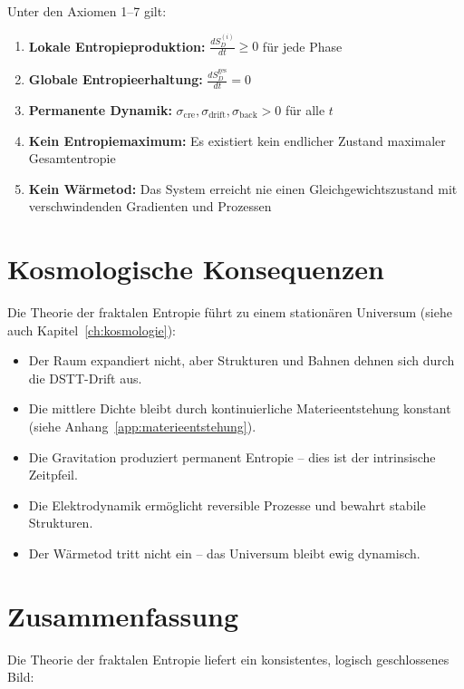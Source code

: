 Unter den Axiomen 1–7 gilt:

\begin{enumerate}
    \item \textbf{Lokale Entropieproduktion:} \( \frac{dS_D^{(i)}}{dt} \geq 0 \) für jede Phase
    \item \textbf{Globale Entropieerhaltung:} \( \frac{dS_D^{\text{ges}}}{dt} = 0 \)
    \item \textbf{Permanente Dynamik:} \( \sigma_{\text{cre}}, \sigma_{\text{drift}}, \sigma_{\text{back}} > 0 \) für alle \( t \)
    \item \textbf{Kein Entropiemaximum:} Es existiert kein endlicher Zustand maximaler Gesamtentropie
    \item \textbf{Kein Wärmetod:} Das System erreicht nie einen Gleichgewichtszustand mit verschwindenden Gradienten und Prozessen
\end{enumerate}

\section{Kosmologische Konsequenzen}
\label{sec:entropie_kosmologie}

Die Theorie der fraktalen Entropie führt zu einem stationären Universum (siehe auch Kapitel~\ref{ch:kosmologie}):

\begin{itemize}
    \item Der Raum expandiert nicht, aber Strukturen und Bahnen dehnen sich durch die DSTT-Drift aus.
    \item Die mittlere Dichte bleibt durch kontinuierliche Materieentstehung konstant (siehe Anhang~\ref{app:materieentstehung}).
    \item Die Gravitation produziert permanent Entropie – dies ist der intrinsische Zeitpfeil.
    \item Die Elektrodynamik ermöglicht reversible Prozesse und bewahrt stabile Strukturen.
    \item Der Wärmetod tritt nicht ein – das Universum bleibt ewig dynamisch.
\end{itemize}

\section{Zusammenfassung}
\label{sec:entropie_zusammenfassung}

Die Theorie der fraktalen Entropie liefert ein konsistentes, logisch geschlossenes Bild:


